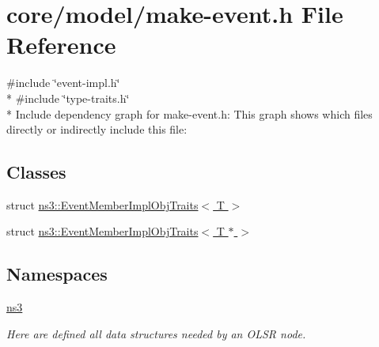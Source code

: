 \hypertarget{make-event_8h}{}\section{core/model/make-\/event.h File Reference}
\label{make-event_8h}
{\ttfamily \#include \char`\"{}event-\/impl.\+h\char`\"{}}\\*
{\ttfamily \#include \char`\"{}type-\/traits.\+h\char`\"{}}\\*
Include dependency graph for make-\/event.h\+:
This graph shows which files directly or indirectly include this file\+:
\subsection*{Classes}
\begin{DoxyCompactItemize}
\item 
struct \hyperlink{structns3_1_1EventMemberImplObjTraits}{ns3\+::\+Event\+Member\+Impl\+Obj\+Traits$<$ T $>$}
\item 
struct \hyperlink{structns3_1_1EventMemberImplObjTraits_3_01T_01_5_01_4}{ns3\+::\+Event\+Member\+Impl\+Obj\+Traits$<$ T $\ast$ $>$}
\end{DoxyCompactItemize}
\subsection*{Namespaces}
\begin{DoxyCompactItemize}
\item 
 \hyperlink{namespacens3}{ns3}
\begin{DoxyCompactList}\small\item\em Here are defined all data structures needed by an O\+L\+SR node. \end{DoxyCompactList}\end{DoxyCompactItemize}
